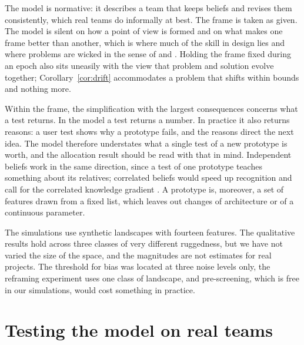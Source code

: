 \documentclass[preprint,review,11pt,authoryear]{elsarticle}
\theoremstyle{definition}
\begin{document}
The model is normative: it describes a team that keeps beliefs and revises them consistently, which real teams do informally at best. The frame is taken as given. The model is silent on how a point of view is formed and on what makes one frame better than another, which is where much of the skill in design lies and where problems are wicked in the sense of \citet{rittel1973} and \citet{buchanan1992}. Holding the frame fixed during an epoch also sits uneasily with the view that problem and solution evolve together; Corollary~\ref{cor:drift} accommodates a problem that shifts within bounds and nothing more. 

Within the frame, the simplification with the largest consequences concerns what a test returns. In the model a test returns a number. In practice it also returns reasons: a user test shows why a prototype fails, and the reasons direct the next idea. The model therefore understates what a single test of a new prototype is worth, and the allocation result should be read with that in mind. Independent beliefs work in the same direction, since a test of one prototype teaches something about its relatives; correlated beliefs would speed up recognition and call for the correlated knowledge gradient \citep{frazier2009}. A prototype is, moreover, a set of features drawn from a fixed list, which leaves out changes of architecture or of a continuous parameter.

The simulations use synthetic landscapes with fourteen features. The qualitative results hold across three classes of very different ruggedness, but we have not varied the size of the space, and the magnitudes are not estimates for real projects. The threshold for bias was located at three noise levels only, the reframing experiment uses one class of landscape, and pre-screening, which is free in our simulations, would cost something in practice.

\section{Testing the model on real teams}
\label{sec:empirical}
\end{document}
